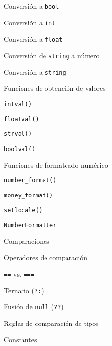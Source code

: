 \begin{longenum}
\begin{longenum}
\begin{longenum}
\begin{longenum}
                \item Conversión a \texttt{bool}
                \item Conversión a \texttt{int}
                \item Conversión a \texttt{float}
                \item Conversión de \texttt{string} a número
                \item Conversión a \texttt{string}
                \item Funciones de obtención de valores
                \begin{longenum}
                    \item \texttt{intval()}
                    \item \texttt{floatval()}
                    \item \texttt{strval()}
                    \item \texttt{boolval()}
                \end{longenum}
                \item Funciones de formateado numérico
                \begin{longenum}
                    \item \texttt{number\_format()}
                    \item \texttt{money\_format()}
                    \begin{longenum}
                        \item \texttt{setlocale()}
                    \end{longenum}
                    \item \texttt{NumberFormatter}
                \end{longenum}
            \end{longenum}
            \item Comparaciones
            \begin{longenum}
                \item Operadores de comparación
                \item \texttt{==} vs. \texttt{===}
                \item Ternario (\texttt{?:})
                \item Fusión de \texttt{null} (\texttt{??})
                \item Reglas de comparación de tipos
            \end{longenum}
        \end{longenum}
        \item Constantes

\end{longenum}
\end{longenum}

